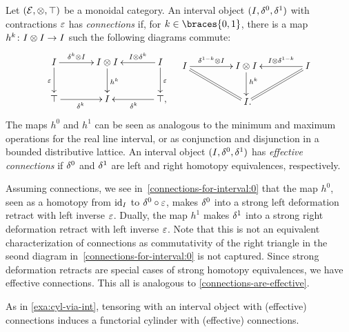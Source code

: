 \documentclass[reqno,10pt,a4paper,oneside,draft]{amsart}
\begin{document}
\begin{example} \label{exa:connections-for-interval}
Let $(\mathcal{E}, \otimes, \top)$ be a monoidal category.
An interval object $(I, \delta^0, \delta^1)$ with contractions $\varepsilon$ has \emph{connections} if, for $k \in \braces{0, 1}$, there is a map $h^k \colon I \otimes I \to I$ such the following diagrams commute:
\begin{align} \label{connections-for-interval:0}
\begin{aligned}
\xymatrix@C+1em{
  \interval
  \ar[r]^-{\kcyl \otimes \interval}
  \ar[d]_{\ccyl}
&
  \interval \otimes \interval
  \ar[d]^{h^k}
&
  \interval
  \ar[l]_-{\interval \otimes \kcyl}
  \ar[d]^{\ccyl}
\\
  \top
  \ar[r]_{\kcyl}
&
  \interval
&
  \top
  \ar[l]^{\kcyl}
\rlap{,}}
\end{aligned}
&&
\begin{aligned}
\xymatrix@C+2em{
  \interval
  \ar[r]^-{\kcylinv \otimes \interval}
  \ar@{=}[dr]
&
  \interval \otimes \interval
  \ar[d]^(0.4){h^k}
&
  \interval
  \ar[l]_-{\interval \otimes \kcylinv}
  \ar@{=}[dl]
\\&
  \interval
\rlap{.}}
\end{aligned}
\end{align}
The maps $h^0$ and $h^1$ can be seen as analogous to the minimum and maximum operations for the real line interval, or as conjunction and disjunction in a bounded distributive lattice.
An interval object $(I, \delta^0, \delta^1)$ has \emph{effective connections} if $\delta^0$ and $\delta^1$ are left and right homotopy equivalences, respectively.

Assuming connections, we see in~\eqref{connections-for-interval:0} that the map $h^0$, seen as a homotopy from $\operatorname{id}_I$ to $\delta^0 \mathbin{\circ} \varepsilon$, makes $\delta^0$ into a strong left deformation retract with left inverse $\varepsilon$.
Dually, the map $h^1$ makes $\delta^1$ into a strong right deformation retract with left inverse $\varepsilon$.
Note that this is not an equivalent characterization of connections as commutativity of the right triangle in the seond diagram in~\eqref{connections-for-interval:0} is not captured.
Since strong deformation retracts are special cases of strong homotopy equivalences, we have effective connections.
This all is analogous to \cref{connections-are-effective}.

As in \cref{exa:cyl-via-int}, tensoring with an interval object with (effective) connections induces a functorial cylinder with (effective) connections.
\end{example}
\end{document}
